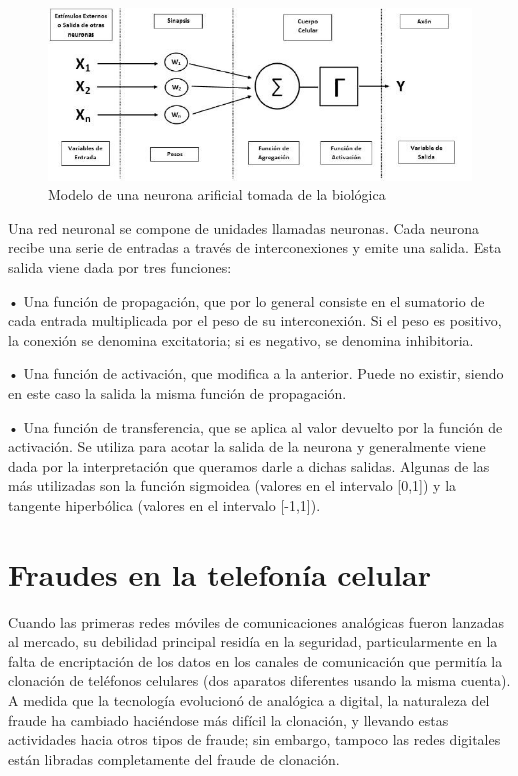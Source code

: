 \documentclass[a4paper,11pt]{article}
\begin{document}
\begin{figure}[h!]
  \centering
  \includegraphics[scale=0.5]{docs/neurona.jpg}
  \caption{Modelo de una neurona arificial tomada de la biológica}
\end{figure}

Una red neuronal se compone de  unidades  llamadas  neuronas.  Cada  neurona
recibe una serie de  entradas  a  través  de  interconexiones  y  emite  una
salida. Esta salida viene dada por tres funciones:

    • Una función  de  propagación,  que  por  lo  general  consiste  en  el
      sumatorio  de  cada  entrada  multiplicada   por   el   peso   de   su
      interconexión. Si  el  peso  es  positivo,  la  conexión  se  denomina
      excitatoria; si es negativo, se denomina inhibitoria.


    • Una función de activación,  que  modifica  a  la  anterior.  Puede  no
      existir,  siendo  en  este  caso  la  salida  la  misma   función   de
      propagación.


    • Una función de transferencia, que se aplica al valor devuelto  por  la
      función de activación. Se utiliza para acotar la salida de la  neurona
      y generalmente viene dada por la interpretación que queramos  darle  a
      dichas salidas. Algunas de las más utilizadas son la función sigmoidea
      (valores en el intervalo [0,1]) y la tangente hiperbólica (valores  en
      el intervalo [-1,1]).


\section{Fraudes en la telefonía celular}

      Cuando las primeras redes móviles de comunicaciones analógicas  fueron
lanzadas al  mercado,  su  debilidad  principal  residía  en  la  seguridad,
particularmente en la falta de encriptación de los datos en los  canales  de
comunicación que permitía la clonación de teléfonos celulares (dos  aparatos
diferentes usando la misma cuenta). A medida que  la  tecnología  evolucionó
de analógica a digital, la naturaleza del fraude ha cambiado haciéndose  más
difícil la clonación, y llevando estas  actividades  hacia  otros  tipos  de
fraude;  sin  embargo,  tampoco   las   redes   digitales   están   libradas
completamente del fraude de clonación.
\end{document}

